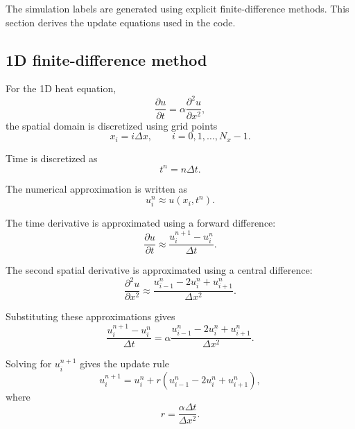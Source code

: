 \documentclass[11pt,a4paper]{article}
\begin{document}
The simulation labels are generated using explicit finite-difference methods. This section derives the update equations used in the code.

\subsection{1D finite-difference method}

For the 1D heat equation,
\begin{equation}
    \frac{\partial u}{\partial t}
    =
    \alpha
    \frac{\partial^2 u}{\partial x^2},
\end{equation}
the spatial domain is discretized using grid points
\begin{equation}
    x_i = i\Delta x,
    \qquad
    i = 0,1,\ldots,N_x-1.
\end{equation}

Time is discretized as
\begin{equation}
    t^n = n\Delta t.
\end{equation}

The numerical approximation is written as
\begin{equation}
    u_i^n \approx u(x_i,t^n).
\end{equation}

The time derivative is approximated using a forward difference:
\begin{equation}
    \frac{\partial u}{\partial t}
    \approx
    \frac{u_i^{n+1} - u_i^n}{\Delta t}.
\end{equation}

The second spatial derivative is approximated using a central difference:
\begin{equation}
    \frac{\partial^2 u}{\partial x^2}
    \approx
    \frac{
    u_{i-1}^{n}
    -
    2u_i^{n}
    +
    u_{i+1}^{n}
    }{\Delta x^2}.
\end{equation}

Substituting these approximations gives
\begin{equation}
    \frac{u_i^{n+1} - u_i^n}{\Delta t}
    =
    \alpha
    \frac{
    u_{i-1}^{n}
    -
    2u_i^{n}
    +
    u_{i+1}^{n}
    }{\Delta x^2}.
\end{equation}

Solving for \(u_i^{n+1}\) gives the update rule
\begin{equation}
    u_i^{n+1}
    =
    u_i^n
    +
    r
    \left(
    u_{i-1}^{n}
    -
    2u_i^{n}
    +
    u_{i+1}^{n}
    \right),
    \label{eq:fdm_1d}
\end{equation}
where
\begin{equation}
    r =
    \frac{\alpha \Delta t}{\Delta x^2}.
    \label{eq:r_1d}
\end{equation}
\end{document}
